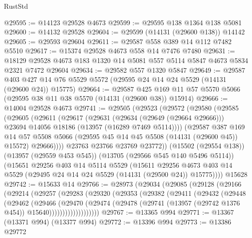 \begin{lexlean}{RustStd}
\begin{coremodule}
@29595 := @14123 @29528 @4673
@29599 := @29595 @138 @1364 @138 @5081
@29600 := @14132 @29528
@29604 := @29599 (@14131 (@29600 @138)) @14142
@29605 := @29593 @29604
@29611 := @29587 @558 @389 @14 @112 @7482 @5510
@29617 := @15374 @29528 @4673 @558 @14 @7476 @7480
@29631 := @18129 @29528 @4673 @183 @1320 @14 @5081 @557 @5114 @5847 @4673 @5834 @2321 @7472 @29604
@29634 := @29582 @557 @1320 @5847
@29649 := @29587
    @403
    @427
    @14
    @76
    @5529
    @5572
    (@29595 @24 @14 @24 @5529 (@14131 (@29600 @24)) @15775)
@29664 := @29587
    @425
    @169
    @11
    @57
    @5570
    @5066
    (@29595 @38 @11 @38 @5570 (@14131 (@29600 @38)) @15914)
@29666 := @14004 @29528 @4673
@29741 := @29505
    (@29523
      (@29572
        (@29580
          (@29585
            (@29605
              (@29611
                (@29617
                  (@29631
                    (@29634 (@29649 (@29664 @29666)))
                    @23694
                    @14056
                    @18186
                    (@13957 (@16289 @7469 @5114))))
                (@29587
                  @387
                  @169
                  @14
                  @57
                  @5508
                  @5066
                  (@29595 @45 @14 @45 @5508 (@14131 (@29600 @45)) @15572)
                  @29666))))
          @23763
          @23766
          @23769
          @23772))
      (@15502 (@29554 @138))
      (@13957 (@29559 @453 @545))
      (@13705 (@29566 @545 @140 @5496 @5114))
      (@15651
        @29256
        @403
        @14
        @5114
        @5529
        (@15611
          @29256
          @4673
          @403
          @14
          @5529
          (@29495 @24 @14 @24 @5529 (@14131 (@29500 @24)) @15775))))
    @15628
@29742 := @15633 @14
@29766 := @28973
    (@29034
      (@29085
        (@29128
          (@29166
            (@29214
              (@29257
                (@29283
                  (@29320
                    (@29353
                      (@29382
                        (@29411
                          (@29432
                            (@29448
                              (@29462
                                (@29466
                                  (@29470
                                    (@29474
                                      (@29478
                                        (@29741
                                          (@13957 (@29742 @1376 @454))
                                          @15640)))))))))))))))))))
@29767 := @13365 @994
@29771 := @13367 (@13371 @994) (@13377 @994)
@29772 := @13396 @994
@29773 := @13386 @29772

\end{coremodule}
\end{lexlean}
